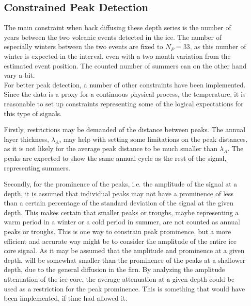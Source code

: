 \documentclass[../../CompleteThesis2/Complete_2ndDraft]{subfiles}
\begin{document}
%		
%		

\subsection[Constrained Peak Detection]{Constrained Peak Detection}
\label{Subsec:CompMeths_PeakDetection_Constrained}
The main constraint when back diffusing these depth series is the number of years between the two volcanic events detected in the ice. The number of especially winters between the two events are fixed to $N_P=33$, as this number of winter is expected in the interval, even with a two month variation from the estimated event position. The counted number of summers can on the other hand vary a bit.\\
For better peak detection, a number of other constraints have been implemented. Since the data is a proxy for a continuous physical process, the temperature, it is reasonable to set up constraints representing some of the logical expectations for this type of signals. 

Firstly, restrictions may be demanded of the distance between peaks. The annual layer thickness, $\lambda_A$, may help with setting some limitations on the peak distances, as it is not likely for the average peak distance to be much smaller than $\lambda_A$. The peaks are expected to show the same annual cycle as the rest of the signal, representing summers. 

Secondly, for the prominence of the peaks, i.e. the amplitude of the signal at a depth, it is assumed that individual peaks may not have a prominence of less than a certain percentage of the standard deviation of the signal at the given depth. This makes certain that smaller peaks or troughs, maybe representing a warm period in a winter or a cold period in summer, are not counted as annual peaks or troughs. 
This is one way to constrain peak prominence, but a more efficient and accurate way might be to consider the amplitude of the entire ice core signal. As it may be assumed that the amplitude and prominence at a given depth, will be somewhat smaller than the prominence of the peaks at a shallower depth, due to the general diffusion in the firn. By analyzing the amplitude attenuation of the ice core, the average attenuation at a given depth could be used as a restriction for the peak prominence. This is something that would have been implemented, if time had allowed it.
\end{document}
